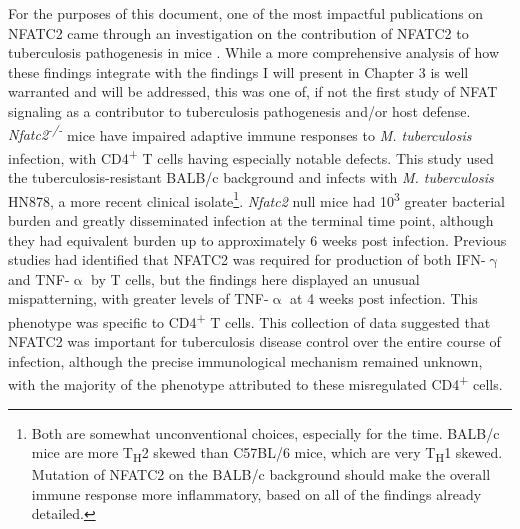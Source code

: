 For the purposes of this document, one of the most impactful publications on NFATC2 came through an investigation on the contribution of NFATC2 to tuberculosis pathogenesis in mice \citep{Via2012}. While a more comprehensive analysis of how these findings integrate with the findings I will present in Chapter 3 is well warranted and will be addressed, this was one of, if not the first study of NFAT signaling as a contributor to tuberculosis pathogenesis and/or host defense. \textit{Nfatc2\textsuperscript{\hyp{}/\hyp{}}} mice have impaired adaptive immune responses to \textit{M. tuberculosis} infection, with CD4\textsuperscript{+} T cells having especially notable defects. This study used the tuberculosis\hyp{}resistant BALB/c background and infects with \textit{M. tuberculosis} HN878, a more recent clinical isolate\footnote{Both are somewhat unconventional choices, especially for the time. BALB/c mice are more T\textsubscript{H}2 skewed than C57BL/6 mice, which are very T\textsubscript{H}1 skewed. Mutation of NFATC2 on the BALB/c background should make the overall immune response more inflammatory, based on all of the findings already detailed.}. \textit{Nfatc2} null mice had 10\textsuperscript{3} greater bacterial burden and greatly disseminated infection at the terminal time point, although they had equivalent burden up to approximately 6 weeks post infection. Previous studies had identified that NFATC2 was required for production of both IFN\hyp{}$\upgamma$ and TNF\hyp{}$\upalpha$ by T cells, but the findings here displayed an unusual mispatterning, with greater levels of TNF\hyp{}$\upalpha$ at 4 weeks post infection. This phenotype was specific to CD4\textsuperscript{+} T cells. This collection of data suggested that NFATC2 was important for tuberculosis disease control over the entire course of infection, although the precise immunological mechanism remained unknown, with the majority of the phenotype attributed to these misregulated CD4\textsuperscript{+} cells. 

